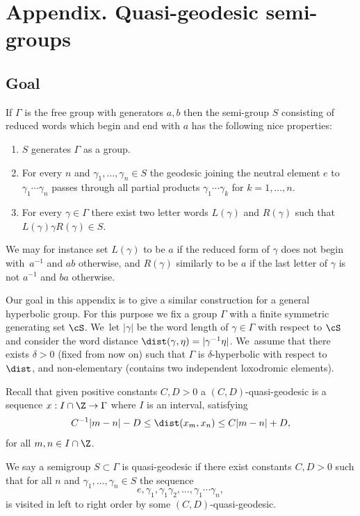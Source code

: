 \section*{Appendix. Quasi-geodesic semi-groups}
\subsection{Goal}

If \(\Gamma\) is the free group with generators \(a,b\) then the semi-group \(S\) consisting of reduced words which begin and end with \(a\) has the following nice properties:
\begin{enumerate}
\item \(S\) generates \(\Gamma\) as a group.
\item For every \(n\) and \(\gamma_1,\ldots, \gamma_n \in S\) the geodesic joining the neutral element \(e\) to \(\gamma_1\cdots \gamma_n\) passes through all partial products \(\gamma_1\cdots \gamma_k\) for \(k = 1,\ldots, n\).
\item For every \(\gamma \in \Gamma\) there exist two letter words \(L(\gamma)\) and \(R(\gamma)\) such that \(L(\gamma)\gamma R(\gamma) \in S\).
\end{enumerate}
We may for instance set \(L(\gamma)\) to be \(a\) if the reduced form of \(\gamma\) does not begin with~\(a^{-1}\) and \(ab\) otherwise, and \(R(\gamma)\) similarly to be \(a\) if the last letter of \(\gamma\) is not \(a^{-1}\) and \(ba\) otherwise.

Our goal in this appendix is to give a similar construction for a general hyperbolic group.
For this purpose we fix a group \(\Gamma\) with a finite symmetric generating set \(\cS\). We~let \(|\gamma|\) be the word length of \(\gamma \in \Gamma\) with respect to \(\cS\) and consider the word distance \(\dist(\gamma,\eta) = |\gamma^{-1}\eta|\). We~assume that there exists \(\delta > 0\) (fixed from now on) such that \(\Gamma\) is \(\delta\)-hyperbolic with respect to \(\dist\), and non-elementary (\ie contains two independent loxodromic elements).

Recall that given positive constants \(C,D > 0\) a \((C,D)\)-quasi-geodesic is a sequence \(x: I \cap \Z \to \Gamma\) where \(I\) is an interval, satisfying
\[
C^{-1}|m-n| - D \le \dist(x_m,x_n) \le C|m-n| + D,
\]
for all \(m,n \in I \cap \Z\).

We say a semigroup \(S \subset \Gamma\) is quasi-geodesic if there exist constants \(C,D > 0\) such that for all \(n\) and \(\gamma_1,\ldots, \gamma_n \in S\) the sequence
\[
e, \gamma_1,\gamma_1\gamma_2,\ldots, \gamma_1\cdots \gamma_n,
\]
is visited in left to right order by some \((C,D)\)-quasi-geodesic.

